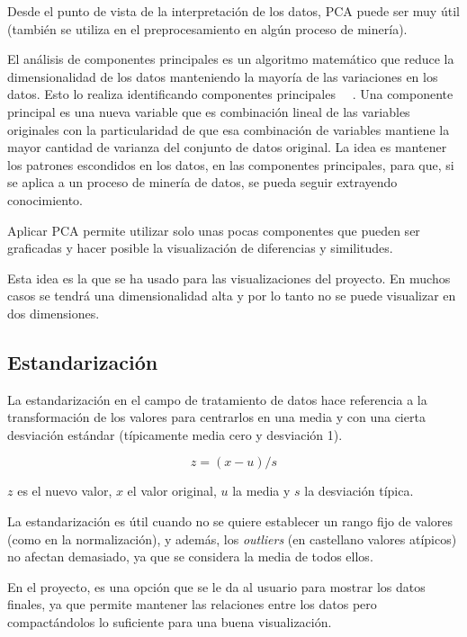 Desde el punto de vista de la interpretación de los datos, PCA puede ser muy
útil (también se utiliza en el preprocesamiento en algún proceso de minería).

El análisis de componentes principales es un algoritmo matemático que reduce la
dimensionalidad de los datos manteniendo la mayoría de las variaciones en los
datos. Esto lo realiza identificando componentes principales~
~\cite{ringner2008principal}. Una componente principal es una nueva variable que
es combinación lineal de las variables originales con la particularidad de que
esa combinación de variables mantiene la mayor cantidad de varianza del conjunto
de datos original. La idea es mantener los patrones escondidos en los datos, en
las componentes principales, para que, si se aplica a un proceso de minería de
datos, se pueda seguir extrayendo conocimiento.

Aplicar PCA permite utilizar solo unas pocas componentes que pueden ser
graficadas y hacer posible la visualización de diferencias y similitudes.

Esta idea es la que se ha usado para las visualizaciones del proyecto. En muchos
casos se tendrá una dimensionalidad alta y por lo tanto no se puede visualizar
en dos dimensiones.

\subsection{Estandarización}

La estandarización en el campo de tratamiento de datos hace referencia a la
transformación de los valores para centrarlos en una media y con una cierta
desviación estándar (típicamente media cero y desviación 1).

\begin{equation}
  z = (x - u) / s
\end{equation}

\noindent $z$ es el nuevo valor, $x$ el valor original, $u$ la media y $s$ la
desviación típica.

La estandarización es útil cuando no se quiere establecer un rango fijo  de
valores (como en la normalización), y además, los \textit{outliers} (en
castellano valores atípicos) no afectan demasiado, ya que se considera la media
de todos ellos.

En el proyecto, es una opción que se le da al usuario para mostrar los datos
finales, ya que permite mantener las relaciones entre los datos pero
compactándolos lo suficiente para una buena visualización.

